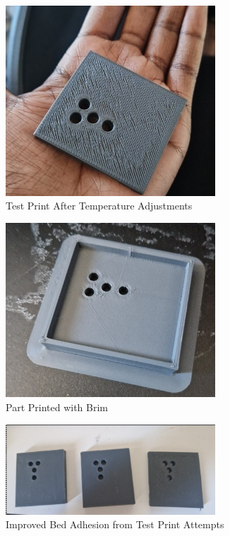 \begin{figure}[htbp]
    \centering
    \includegraphics[width=0.7\textwidth]{figures/CAD-3DPrint/FAIL2.jpg}
    \caption{Test Print After Temperature Adjustments}
    \label{fig:Fail2}
   
    
\end{figure}

\begin{figure}[htbp]
    \centering
    \includegraphics[width=0.7\textwidth]{figures/CAD-3DPrint/CADwitDaBrim.jpg}
    \caption{Part Printed with Brim}
    \label{fig:Brim}
   
    
\end{figure}

\begin{figure}[htbp]
    \centering
    \includegraphics[width=0.7\textwidth]{figures/CAD-3DPrint/BedAdImproved.png}
    \caption{Improved Bed Adhesion from Test Print Attempts}
    \label{fig:BedAdImproved}
   
    
\end{figure}

